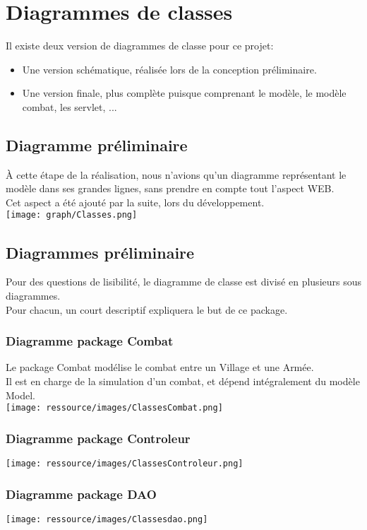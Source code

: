 \chapter{Diagrammes de classes}
    Il existe deux version de diagrammes de classe pour ce projet:
    \begin{itemize}
        \item Une version schématique, réalisée lors de la conception préliminaire.
        \item Une version finale, plus complète puisque comprenant le modèle, le modèle combat, les servlet, ...
    \end{itemize}
    \section{Diagramme préliminaire}
        À cette étape de la réalisation, nous n'avions qu'un diagramme représentant le modèle dans ses grandes lignes, sans prendre en compte tout l'aspect WEB.\\
        Cet aspect a été ajouté par la suite, lors du développement.\\

        \texttt{[image: graph/Classes.png]}
    \section{Diagrammes préliminaire}
        Pour des questions de lisibilité, le diagramme de classe est divisé en plusieurs sous diagrammes.\\
        Pour chacun, un court descriptif expliquera le but de ce package.
        \subsection{Diagramme package Combat}
            Le package Combat modélise le combat entre un Village et une Armée.\\
            Il est en charge de la simulation d'un combat, et dépend intégralement du modèle Model.\\

            \texttt{[image: ressource/images/ClassesCombat.png]}
        \subsection{Diagramme package Controleur}
            \texttt{[image: ressource/images/ClassesControleur.png]}
        \subsection{Diagramme package DAO}
            \texttt{[image: ressource/images/Classesdao.png]}
